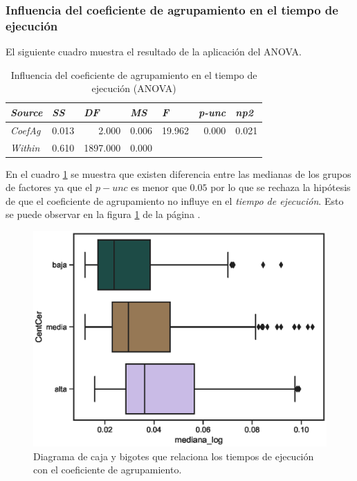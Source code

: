 \documentclass{article}
\begin{document}
\subsubsection{Influencia del coeficiente de agrupamiento en el tiempo de ejecución}
El siguiente cuadro muestra el resultado de la aplicación del ANOVA.

\begin{table}[htbp]
  \centering
  \caption{Influencia del coeficiente de agrupamiento en el tiempo de ejecución (ANOVA)}
    \begin{tabular}{lrrrrrr}
    \toprule
    \textit{\textbf{Source}} & \multicolumn{1}{l}{\textit{\textbf{SS}}} & \multicolumn{1}{l}{\textit{\textbf{DF}}} & \multicolumn{1}{l}{\textit{\textbf{MS}}} & \multicolumn{1}{l}{\textit{\textbf{F}}} & \multicolumn{1}{l}{\textit{\textbf{p-unc}}} & \multicolumn{1}{l}{\textit{\textbf{np2}}} \\
    \midrule
    \textit{CoefAg} & 0.013 & 2.000 & 0.006 & 19.962 & 0.000 & 0.021 \\
    \textit{Within} & 0.610 & 1897.000 & 0.000 &       &       &  \\
    \bottomrule
    \end{tabular}%
  \label{tab:t5}%
\end{table}%

En el cuadro \ref{tab:t5} se muestra que existen diferencia entre las medianas de los grupos de factores ya que el \emph{$p-unc$} es menor que $0.05$ por lo que se rechaza la hipótesis de que el coeficiente de agrupamiento no influye en el \textit{tiempo de ejecución}. Esto se puede observar en la figura \ref{fig14} de la página \pageref{fig14}. 

\begin{center}
\begin{figure}[htbp]
\includegraphics[scale=0.6]{boxplot_CentCer.eps}
\caption{Diagrama de caja y bigotes que relaciona los tiempos de ejecución con el coeficiente de agrupamiento.}
\label{fig14}
\end{figure}
\end{center}
\end{document}
